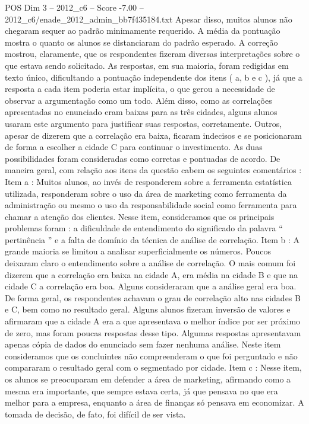 \begin{textsample}{POS Dim 3 – 2012\_c6 – Score -7.00 – 2012\_c6/enade\_2012\_admin\_bb7f435184.txt}
Apesar disso, muitos alunos não chegaram sequer ao padrão minimamente requerido.
A média da pontuação mostra o quanto os alunos se distanciaram do padrão esperado.
A correção mostrou, claramente, que os respondentes fizeram diversas interpretações sobre o que estava sendo solicitado.
As respostas, em sua maioria, foram redigidas em texto único, dificultando a pontuação independente dos itens ( a, b e c ), já que a resposta a cada item poderia estar implícita, o que gerou a necessidade de observar a argumentação como um todo.
Além disso, como as correlações apresentadas no enunciado eram baixas para as três cidades, alguns alunos usaram este argumento para justificar suas respostas, corretamente.
Outros, apesar de dizerem que a correlação era baixa, ficaram indecisos e se posicionaram de forma a escolher a cidade C para continuar o investimento.
As duas possibilidades foram consideradas como corretas e pontuadas de acordo.
De maneira geral, com relação aos itens da questão cabem os seguintes comentários : Item a : Muitos alunos, ao invés de responderem sobre a ferramenta estatística utilizada, responderam sobre o uso da área de marketing como ferramenta da administração ou mesmo o uso da responsabilidade social como ferramenta para chamar a atenção dos clientes.
Nesse item, consideramos que os principais problemas foram : a dificuldade de entendimento do significado da palavra “ pertinência ” e a falta de domínio da técnica de análise de correlação.
Item b : A grande maioria se limitou a analisar superficialmente os números.
Poucos deixaram claro o entendimento sobre a análise de correlação.
O mais comum foi dizerem que a correlação era baixa na cidade A, era média na cidade B e que na cidade C a correlação era boa.
Alguns consideraram que a análise geral era boa.
De forma geral, os respondentes achavam o grau de correlação alto nas cidades B e C, bem como no resultado geral.
Alguns alunos fizeram inversão de valores e afirmaram que a cidade A era a que apresentava o melhor índice por ser próximo de zero, mas foram poucas respostas desse tipo.
Algumas respostas apresentavam apenas cópia de dados do enunciado sem fazer nenhuma análise.
Neste item consideramos que os concluintes não compreenderam o que foi perguntado e não compararam o resultado geral com o segmentado por cidade.
Item c : Nesse item, os alunos se preocuparam em defender a área de marketing, afirmando como a mesma era importante, que sempre estava certa, já que pensava no que era melhor para a empresa, enquanto a área de finanças só pensava em economizar.
A tomada de decisão, de fato, foi difícil de ser vista.

\end{textsample}
